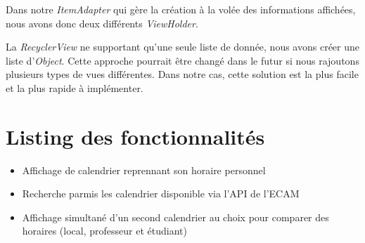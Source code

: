 \documentclass{article}
\begin{document}
            Dans notre \textit{ItemAdapter} qui gère la création à la volée des informations
            affichées, nous avons donc deux différents \textit{ViewHolder}.

            La \textit{RecyclerView} ne supportant qu'une seule liste de donnée, nous avons créer
            une liste d'\textit{Object}. Cette approche pourrait être changé dans le futur si nous
            rajoutons plusieurs types de vues différentes. Dans notre cas, cette solution est la
            plus facile et la plus rapide à implémenter.

	\section{Listing des fonctionnalités}
    \begin{itemize}
        \item Affichage de calendrier reprennant son horaire personnel
        \item Recherche parmis les calendrier disponible via l'API de l'ECAM
        \item Affichage simultané d'un second calendrier au choix pour comparer des horaires (local, professeur et étudiant)
    \end{itemize}
\end{document}
